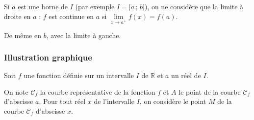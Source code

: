 \documentclass[11pt,a4paper]{article}
\newcommand{\R}{\mathbb{R}}
\newcommand{\Cf}{\mathscr{C}_f}
\newcommand{\intff}[2]{\mathopen{[}#1\,;\,#2\mathclose{]}}
\newcommand{\limd}[2]{\lim\limits_{x\to #1^+}#2}
\begin{document}
\begin{remarque}
Si $a$ est une borne de $I$ (par exemple $I=\intff{a}{b}$), on ne considère que la
limite à droite en $a$ : $f$ est continue en $a$ si $\limd{a}{f(x)}=f(a)$.

De même en $b$, avec la limite à gauche.
\end{remarque}

\subsubsection{Illustration graphique}

Soit $f$ une fonction définie sur un intervalle $I$ de $\R$ et $a$ un réel de $I$.

On note $\Cf$ la courbe représentative de la fonction $f$ et $A$ le point de la
courbe $\Cf$ d'abscisse $a$. Pour tout réel $x$ de l'intervalle $I$, on considère
le point $M$ de la courbe $\Cf$ d'abscisse $x$.
\end{document}
